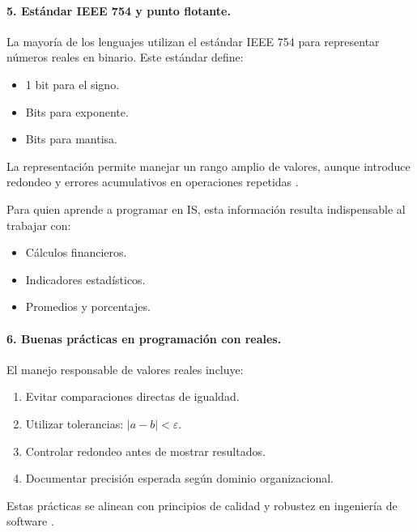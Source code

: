 \documentclass[12pt,twoside]{book}
\begin{document}
						\paragraph{5. Estándar IEEE 754 y punto flotante.} La mayoría de los lenguajes utilizan el estándar IEEE 754 para representar números reales en binario. Este estándar define:
						
						\begin{itemize}
							\item 1 bit para el signo.
							\item Bits para exponente.
							\item Bits para mantisa.
						\end{itemize}
						
						\noindent
						La representación permite manejar un rango amplio de valores, aunque introduce redondeo y errores acumulativos en operaciones repetidas \cite{IEEE2019Standard754,Goldberg1991What,Tanenbaum2021Structured}.
						
						Para quien aprende a programar en IS, esta información resulta indispensable al trabajar con:
						
						\begin{itemize}
							\item Cálculos financieros.
							\item Indicadores estadísticos.
							\item Promedios y porcentajes.
						\end{itemize}
						
						\paragraph{6. Buenas prácticas en programación con reales.} El manejo responsable de valores reales incluye:
						
						\begin{enumerate}
							\item Evitar comparaciones directas de igualdad.
							\item Utilizar tolerancias: $|a-b| < \varepsilon$.
							\item Controlar redondeo antes de mostrar resultados.
							\item Documentar precisión esperada según dominio organizacional.
						\end{enumerate}
						\noindent
						Estas prácticas se alinean con principios de calidad y robustez en ingeniería de software \cite{Ghezzi2003Fundamentals,Sommerville2015Software,Pressman2019Software}.
						
\end{document}
